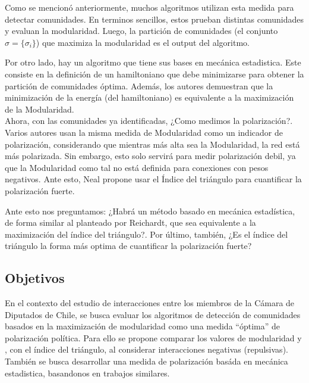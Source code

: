 \documentclass{proyectotesis}
\begin{document}
Como se mencionó anteriormente, muchos algoritmos utilizan esta medida para detectar comunidades. En terminos sencillos, estos prueban distintas comunidades y evaluan la modularidad. Luego, la partición de comunidades (el conjunto $\sigma = \{\sigma_i\}$) que maximiza la modularidad es el output del algoritmo.


Por otro lado, hay un algoritmo que tiene sus bases en mecánica estadistica. Este consiste en la definición de un hamiltoniano que debe minimizarse para obtener la partición de comunidades óptima. Además, los autores demuestran que la minimización de la energía (del hamiltoniano) es equivalente a la maximización de la Modularidad.\\

Ahora, con las comunidades ya identificadas, ¿Como medimos la polarización?. Varios autores usan la misma medida de Modularidad como un indicador de polarización, considerando que mientras más alta sea la Modularidad, la red está más polarizada. Sin embargo, esto solo servirá para medir polarización debil, ya que la Modularidad como tal no está definida para conexiones con pesos negativos. Ante esto, Neal propone usar el Índice del triángulo para cuantificar la polarización fuerte. 

Ante esto nos preguntamos: ¿Habrá un método basado en mecánica estadística, de forma similar al planteado por Reichardt, que sea equivalente a la maximización del índice del triángulo?. Por último, también, ¿Es el índice del triángulo la forma más optima de cuantificar la polarización fuerte?

\subsection{Objetivos}

En el contexto del estudio de interacciones entre los miembros de la Cámara de Diputados de Chile, se busca evaluar los algoritmos de detección de comunidades basados en la maximización de modularidad como una medida ``óptima'' de polarización política. Para ello se propone comparar los valores de modularidad y , con el índice del triángulo, al considerar interacciones negativas (repulsivas). 
También se busca desarrollar una medida de polarización basáda en mecánica estadistica, basandonos en trabajos similares.
\end{document}
